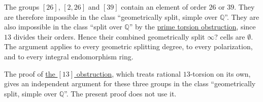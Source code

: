 \documentclass[11pt]{article}
\newcommand{\Q}{\mathbb Q}
\begin{document}
The groups \href{https://genus-2-torsion.github.io/group.html?g=26}{\([26]\)},
\href{https://genus-2-torsion.github.io/group.html?g=2.26}{\([2,26]\)} and
\href{https://genus-2-torsion.github.io/group.html?g=39}{\([39]\)} contain an element of order
\(26\) or \(39\). They are therefore impossible in the class
``geometrically split, simple over \(\Q\)''. They are also impossible
in the class ``split over \(\Q\)'' by the
\href{https://genus-2-torsion.github.io/proofs/qsplit-prime-obstruction.html}{prime torsion
obstruction}, since \(13\) divides their orders. Hence their combined
geometrically split \(\infty\)? cells are \(\emptyset\). The argument
applies to every geometric splitting degree, to every polarization, and
to every integral endomorphism ring.

The proof of
\href{https://genus-2-torsion.github.io/proofs/qsimple-13-obstruction.html}{the \([13]\)
obstruction}, which treats rational \(13\)-torsion on its own, gives an
independent argument for these three groups in the class
``geometrically split, simple over \(\Q\)''. The present proof does not
use it.
\end{document}
